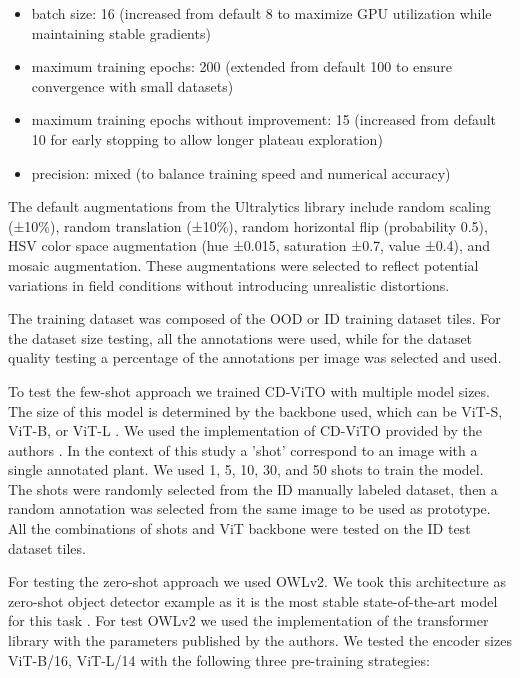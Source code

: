 \documentclass[12pt,a4paper,oneside]{report}
\begin{document}
\begin{itemize}
  \item batch size: 16 (increased from default 8 to maximize GPU utilization while maintaining stable gradients)
  \item maximum training epochs: 200 (extended from default 100 to ensure convergence with small datasets)
  \item maximum training epochs without improvement: 15 (increased from default 10 for early stopping to allow longer plateau exploration)
  \item precision: mixed (to balance training speed and numerical accuracy)
\end{itemize}

The default augmentations from the Ultralytics library include random scaling (±10\%), 
random translation (±10\%), random horizontal flip (probability 0.5), 
HSV color space augmentation (hue ±0.015, saturation ±0.7, value ±0.4), 
and mosaic augmentation. These augmentations were selected to reflect potential 
variations in field conditions without introducing unrealistic distortions.

The training dataset was composed of the OOD or ID training dataset tiles.
For the dataset size testing, all the annotations were used, while for the dataset quality testing
a percentage of the annotations per image was selected and used.

To test the few-shot approach we trained CD-ViTO with multiple model sizes.
The size of this model is determined by the backbone used, which can be ViT-S, ViT-B, or ViT-L \cite{oquabDINOv2LearningRobust2024}. 
We used the implementation of CD-ViTO provided by the authors \cite{fuCrossDomainFewShotObject2024}.
In the context of this study a 'shot' correspond to an image with a single annotated plant. 
We used 1, 5, 10, 30, and 50 shots to train the model.
The shots were randomly selected from the ID manually labeled dataset, then a 
random annotation was selected from the same image to be used as prototype.
All the combinations of shots and ViT backbone were tested on the ID test dataset tiles.

For testing the zero-shot approach we used OWLv2.
We took this architecture as zero-shot object detector example as it is the most stable 
state-of-the-art model for this task \cite{mindererScalingOpenVocabularyObject2023,liuGroundingDINOMarrying2025}.
For test OWLv2 we used the implementation of the transformer library \cite{wolfTransformersStateoftheArtNatural2020}
with the parameters published by the authors.
We tested the encoder sizes ViT-B/16, ViT-L/14 with the following three pre-training 
strategies:
\end{document}
